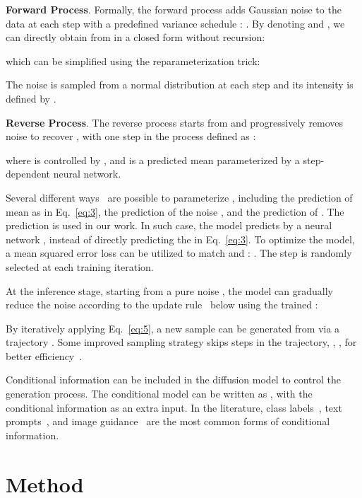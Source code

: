 \documentclass[10pt,twocolumn,letterpaper]{article}
\begin{document}
\textbf{Forward Process}. Formally, the forward process adds Gaussian noise to the data at each step with a predefined variance schedule :
.
By denoting  and , we can directly obtain  from  in a closed form without recursion:

which can be simplified using the reparameterization trick:

The noise  is sampled from a normal distribution at each step and its intensity is defined by .







\textbf{Reverse Process}.
The reverse process starts from  and progressively removes noise to recover , with one step in the process defined as :

where  is controlled by , and  is a predicted mean parameterized by a step-dependent neural network. 




Several different ways~\cite{luo2022understanding} are possible to parameterize , including the prediction of mean as in Eq.~\ref{eq:3}, the prediction of the noise , and the prediction of .
The  prediction is used in our work.
In such case, the model predicts  by a neural network , instead of directly predicting the  in Eq.~\ref{eq:3}.
To optimize the model, a mean squared error loss can be utilized to match  and :
.
The step  is randomly selected at each training iteration. 

At the inference stage, starting from a pure noise , the model can gradually reduce the noise according to the update rule~\cite{DDIM} below using the trained :

By iteratively applying Eq.~\ref{eq:5}, a new sample  can be generated from  via a trajectory . 
Some improved sampling strategy skips steps in the trajectory, \ie, , for better efficiency~\cite{DDIM}.




Conditional information can be included in the diffusion model to control the generation process.
The conditional model can be written as , with the conditional information  as an extra input. 
In the literature, class labels~\cite{BeatsGAN}, text prompts~\cite{gu2022vector,kim2021diffusionclip}, and image guidance~\cite{preechakul2022diffusion} are the most common forms of conditional information.

\section{Method}
\end{document}
